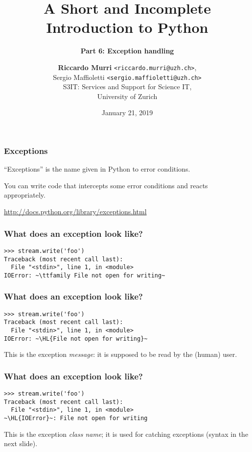 \documentclass[english,serif,mathserif,xcolor=pdftex,dvipsnames,table]{beamer}
\title[6. Exception handling]{%
  A Short and Incomplete Introduction to Python
}
\subtitle{\bfseries Part 6: Exception handling}
\author[R.~Murri]{%
  \textbf{Riccardo Murri} \texttt{<riccardo.murri@uzh.ch>}, \\
  Sergio Maffioletti \texttt{<sergio.maffioletti@uzh.ch>}
  \\
  S3IT: Services and Support for Science IT,
  \\
  University of Zurich
}
\date{January 21, 2019}
\begin{document}
\maketitle



\begin{frame}[fragile]
  \frametitle{Exceptions}

  ``Exceptions'' is the name given in Python to error conditions.

  \+
  You can write code that intercepts some error conditions and
  reacts appropriately.

  \+
  \begin{seealso}
    \url{http://docs.python.org/library/exceptions.html}
  \end{seealso}
\end{frame}


\begin{frame}[fragile]
  \frametitle{What does an exception look like?}
\begin{lstlisting}
>>> stream.write('foo')
Traceback (most recent call last):
  File "<stdin>", line 1, in <module>
IOError: ~\ttfamily File not open for writing~
\end{lstlisting}
\end{frame}


\begin{frame}[fragile]
  \frametitle{What does an exception look like?}
\begin{lstlisting}
>>> stream.write('foo')
Traceback (most recent call last):
  File "<stdin>", line 1, in <module>
IOError: ~\HL{File not open for writing}~
\end{lstlisting}

  \+
  This is the exception \emph{message}: it is supposed to be read
  by the (human) user.
\end{frame}


\begin{frame}[fragile]
  \frametitle{What does an exception look like?}
\begin{lstlisting}
>>> stream.write('foo')
Traceback (most recent call last):
  File "<stdin>", line 1, in <module>
~\HL{IOError}~: File not open for writing
\end{lstlisting}

  \+ This is the exception \emph{class name}; it is used for catching
  exceptions (syntax in the next slide).
\end{frame}
\end{document}
